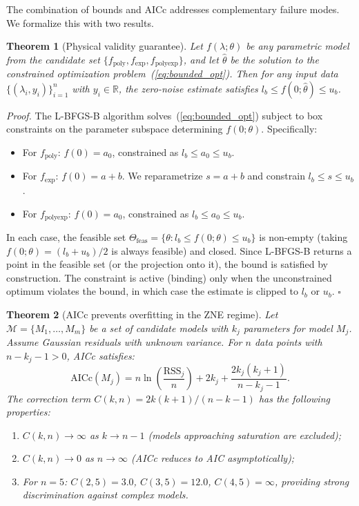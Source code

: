 The combination of bounds and AICc addresses complementary failure modes. We formalize this with two results.

\textbf{Theorem 1} (Physical validity guarantee). \textit{Let $f(\lambda;\theta)$ be any parametric model from the candidate set $\{f_\text{poly}, f_\text{exp}, f_\text{polyexp}\}$, and let $\hat\theta$ be the solution to the constrained optimization problem~(\ref{eq:bounded_opt}). Then for any input data $\{(\lambda_i, y_i)\}_{i=1}^n$ with $y_i \in \mathbb{R}$, the zero-noise estimate satisfies $l_b \leq f(0;\hat\theta) \leq u_b$.}

\textit{Proof.} The L-BFGS-B algorithm solves~(\ref{eq:bounded_opt}) subject to box constraints on the parameter subspace determining $f(0;\theta)$. Specifically:
\begin{itemize}
    \item For $f_\text{poly}$: $f(0) = a_0$, constrained as $l_b \leq a_0 \leq u_b$.
    \item For $f_\text{exp}$: $f(0) = a + b$. We reparametrize $s = a + b$ and constrain $l_b \leq s \leq u_b$.
    \item For $f_\text{polyexp}$: $f(0) = a_0$, constrained as $l_b \leq a_0 \leq u_b$.
\end{itemize}
In each case, the feasible set $\Theta_\text{feas} = \{\theta : l_b \leq f(0;\theta) \leq u_b\}$ is non-empty (taking $f(0;\theta) = (l_b + u_b)/2$ is always feasible) and closed. Since L-BFGS-B returns a point in the feasible set (or the projection onto it), the bound is satisfied by construction. The constraint is active (binding) only when the unconstrained optimum violates the bound, in which case the estimate is clipped to $l_b$ or $u_b$. $\square$

\textbf{Theorem 2} (AICc prevents overfitting in the ZNE regime). \textit{Let $\mathcal{M} = \{M_1, \ldots, M_m\}$ be a set of candidate models with $k_j$ parameters for model $M_j$. Assume Gaussian residuals with unknown variance. For $n$ data points with $n - k_j - 1 > 0$, AICc satisfies:}
\begin{equation}
    \text{AICc}(M_j) = n\ln\!\left(\frac{\text{RSS}_j}{n}\right) + 2k_j + \frac{2k_j(k_j+1)}{n - k_j - 1}.
\end{equation}
\textit{The correction term $C(k,n) = 2k(k+1)/(n-k-1)$ has the following properties:}
\begin{enumerate}
    \item[(i)] \textit{$C(k,n) \to \infty$ as $k \to n-1$ (models approaching saturation are excluded);}
    \item[(ii)] \textit{$C(k,n) \to 0$ as $n \to \infty$ (AICc reduces to AIC asymptotically);}
    \item[(iii)] \textit{For $n=5$: $C(2,5) = 3.0$, $C(3,5) = 12.0$, $C(4,5) = \infty$, providing strong discrimination against complex models.}
\end{enumerate}

